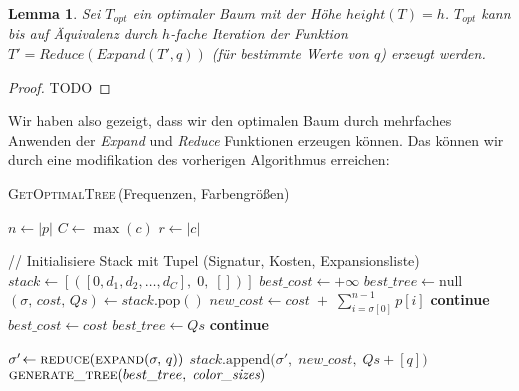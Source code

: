 \documentclass[a4paper,10pt,ngerman]{scrartcl}
\newtheorem{lemma}[satz]{Lemma}
\begin{document}
    \begin{lemma}
        Sei $T_{opt}$ ein optimaler Baum mit der Höhe $height(T) = h$. $T_{opt}$ kann bis auf Äquivalenz durch $h$-fache Iteration der Funktion $T' = Reduce(Expand(T',q))$ (für bestimmte Werte von $q$) erzeugt werden. %
    \end{lemma}
    \begin{proof}
        TODO
    \end{proof}
    Wir haben also gezeigt, dass wir den optimalen Baum durch mehrfaches Anwenden der \textit{Expand} und \textit{Reduce} Funktionen erzeugen können.
    Das können wir durch eine modifikation des vorherigen Algorithmus erreichen:
    \begin{algorithm} [H]
        \caption{\textsc{GetOptimalTree}\,(Frequenzen, Farbengrößen)}
        \begin{algorithmic}[1]
                \State $n \gets |p|$  
                \State $C \gets \max(c)$ 
                \State $r \gets |c|$  

                \State // Initialisiere Stack mit Tupel (Signatur, Kosten, Expansionsliste)
                \State $stack \gets [([0, d_1, d_2, \dots, d_C],\;0,\;[])]$
                \State $best\_cost \gets +\infty$
                \State $best\_tree \gets \text{null}$
                    \State $(\sigma,\,cost,\,Qs) \gets stack.\mathrm{pop}()$
                    \State $new\_cost \gets cost \;+\;\sum_{i=\sigma[0]}^{n-1} p[i]$
                        \State \textbf{continue}
                    \EndIf
                            \State $best\_cost \gets cost$
                            \State $best\_tree \gets Qs$
                        \EndIf
                        \State \textbf{continue}
                    \EndIf

                        \State $\sigma'\!\gets \textsc{reduce}(\textsc{expand}(\sigma,\,q))$
                        \State $stack.\mathrm{append}\bigl(\sigma',\;new\_cost,\;Qs + [q]\bigr)$
                    \EndFor
                \EndWhile
                \State \Return $\textsc{generate\_tree}(best\_tree,\;\textit{color\_sizes})$
            \EndFunction
        \end{algorithmic}\label{alg:algorithm}
    \end{algorithm}
\end{document}

